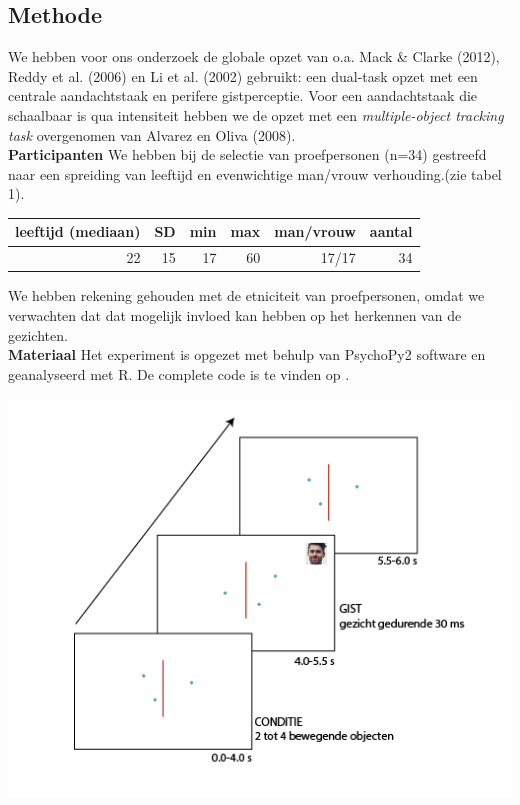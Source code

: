 \documentclass[a0,portrait]{a0poster}
\begin{document}
\begin{multicols}{3}
\section*{Methode}
We hebben voor ons onderzoek de globale opzet van o.a. Mack \& Clarke (2012), Reddy et al. (2006) en Li et al. (2002) gebruikt: een dual-task opzet met een centrale aandachtstaak en perifere gistperceptie. Voor een aandachtstaak die schaalbaar is qua intensiteit hebben we de opzet met een \textit{multiple-object tracking task} overgenomen van Alvarez en Oliva (2008)\nocite{Alvarez_Oliva_2008}.\\
\textbf{Participanten} We hebben bij de selectie van proefpersonen (n=34) gestreefd naar een spreiding van leeftijd en evenwichtige man/vrouw verhouding.(zie tabel 1). 
\begin{center}
\begin{tabular}{r r r r r r} 
	\hline
	leeftijd (mediaan) & SD & min & max & man/vrouw & aantal \\
	\hline
	22 & 15 & 17 & 60 & 17/17 & 34\\
	\hline
\end{tabular}
\end{center}
We hebben rekening gehouden met de etniciteit van proefpersonen, omdat we verwachten dat dat mogelijk invloed kan hebben op het herkennen van de gezichten\cite{sporer2001recognizing}. \\
\textbf{Materiaal} Het experiment is opgezet met behulp van PsychoPy2 software\cite{peirce2007psychopy, Peirce2009generating} en geanalyseerd met R\cite{Rsoftware}. De complete code is te vinden op \cite{Grouls2017}.

\begin{center}\vspace{1cm}
\includegraphics[width=1.0\linewidth]{Methode.png}
\end{center}\vspace{1cm}


\end{multicols}
\end{document}
